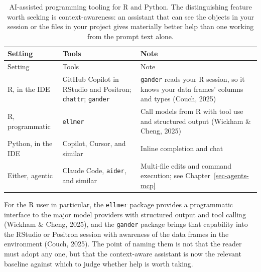 \documentclass[
  letterpaper,
  11pt]{scrbook}
\begin{document}
\begin{longtable}[]{@{}
  >{\raggedright\arraybackslash}p{}
  >{\raggedright\arraybackslash}p{}
  >{\raggedright\arraybackslash}p{}@{}}
\caption{AI-assisted programming tooling for R and Python. The
distinguishing feature worth seeking is context-awareness: an assistant
that can see the objects in your session or the files in your project
gives materially better help than one working from the prompt text
alone.}\label{tbl-ai-tools}\tabularnewline
\toprule\noalign{}
\begin{minipage}[b]{\linewidth}\raggedright
Setting
\end{minipage} & \begin{minipage}[b]{\linewidth}\raggedright
Tools
\end{minipage} & \begin{minipage}[b]{\linewidth}\raggedright
Note
\end{minipage} \\
\midrule\noalign{}
\endfirsthead
\toprule\noalign{}
\begin{minipage}[b]{\linewidth}\raggedright
Setting
\end{minipage} & \begin{minipage}[b]{\linewidth}\raggedright
Tools
\end{minipage} & \begin{minipage}[b]{\linewidth}\raggedright
Note
\end{minipage} \\
\midrule\noalign{}
\endhead
\bottomrule\noalign{}
\endlastfoot
R, in the IDE & GitHub Copilot in RStudio and Positron; \texttt{chattr};
\texttt{gander} & \texttt{gander} reads your R session, so it knows your
data frames' columns and types (Couch, 2025) \\
R, programmatic & \texttt{ellmer} & Call models from R with tool use and
structured output (Wickham \& Cheng, 2025) \\
Python, in the IDE & Copilot, Cursor, and similar & Inline completion
and chat \\
Either, agentic & Claude Code, \texttt{aider}, and similar & Multi-file
edits and command execution; see Chapter~\ref{sec-agents-mcp} \\
\end{longtable}

For the R user in particular, the \texttt{ellmer} package provides a
programmatic interface to the major model providers with structured
output and tool calling (Wickham \& Cheng, 2025), and the
\texttt{gander} package brings that capability into the RStudio or
Positron session with awareness of the data frames in the environment
(Couch, 2025). The point of naming them is not that the reader must
adopt any one, but that the context-aware assistant is now the relevant
baseline against which to judge whether help is worth taking.
\end{document}
